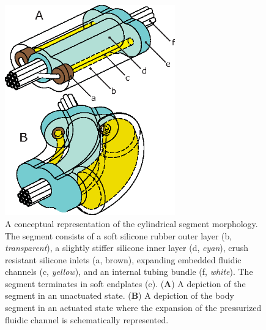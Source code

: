 \begin{figure}[htb]
\centering
\includegraphics[width=2.9in]{Figures/actuators/cylindrical_design.eps}
\caption[A conceptual representation of the cylindrical segment morphology.]{A conceptual representation of the cylindrical segment morphology. The segment consists of a soft silicone rubber outer layer (b, \emph{transparent}), a slightly stiffer silicone inner layer (d, \emph{cyan}), crush resistant silicone inlets (a, brown), expanding embedded fluidic channels (c, \emph{yellow}), and an internal tubing bundle (f, \emph{white}). The segment terminates in soft endplates (e). (\textbf{A}) A depiction of the segment in an unactuated state. (\textbf{B}) A depiction of the body segment in an actuated state where the expansion of the pressurized fluidic channel is schematically represented.
}\label{fig:cylindrical_design}
\end{figure}


